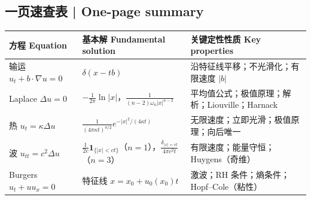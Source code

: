 \documentclass[UTF8,11pt,a4paper]{ctexart}
\begin{document}
\subsection{一页速查表 | One-page summary}
\begin{center}\small
\begin{tabular}{@{}>{\raggedright\arraybackslash}p{2.9cm}>{\raggedright\arraybackslash}p{4.5cm}>{\raggedright\arraybackslash}p{8.0cm}@{}}
\toprule
方程 Equation & 基本解 Fundamental solution & 关键定性性质 Key properties \\
\midrule
输运 $u_t+b\cdot\nabla u=0$ & $\delta(x-tb)$ & 沿特征线平移；不光滑化；有限速度 $|b|$ \\
Laplace $\Delta u=0$ & $-\frac1{2\pi}\ln|x|$，$\frac{1}{(n-2)\omega_n|x|^{n-2}}$ & 平均值公式；极值原理；解析；Liouville；Harnack \\
热 $u_t=\kappa\Delta u$ & $\frac{1}{(4\pi\kappa t)^{n/2}}e^{-|x|^2/(4\kappa t)}$ & 无限速度；立即光滑；极值原理；向后唯一 \\
波 $u_{tt}=c^2\Delta u$ & $\frac{1}{2c}\mathbf 1_{\{|x|<ct\}}$（$n=1$），$\frac{\delta_{|x|=ct}}{4\pi c^2t}$（$n=3$） & 有限速度；能量守恒；Huygens（奇维） \\
Burgers $u_t+uu_x=0$ & 特征线 $x=x_0+u_0(x_0)t$ & 激波；RH 条件；熵条件；Hopf--Cole（粘性） \\
\bottomrule
\end{tabular}
\end{center}
\end{document}

